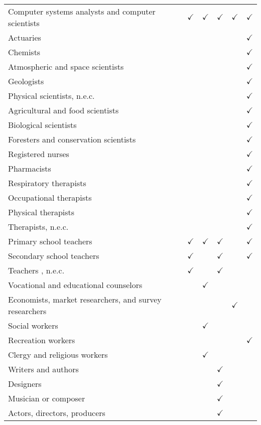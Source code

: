 \begin{tabular}[t]{llllll}
Computer systems analysts and computer scientists & $\checkmark$ & $\checkmark$ & $\checkmark$ & $\checkmark$ & $\checkmark$\\
Actuaries &  &  &  &  & $\checkmark$\\
Chemists &  &  &  &  & $\checkmark$\\
Atmospheric and space scientists &  &  &  &  & $\checkmark$\\
Geologists &  &  &  &  & $\checkmark$\\
Physical scientists, n.e.c. &  &  &  &  & $\checkmark$\\
Agricultural and food scientists &  &  &  &  & $\checkmark$\\
Biological scientists &  &  &  &  & $\checkmark$\\
Foresters and conservation scientists &  &  &  &  & $\checkmark$\\
Registered nurses &  &  &  &  & $\checkmark$\\
Pharmacists &  &  &  &  & $\checkmark$\\
Respiratory therapists &  &  &  &  & $\checkmark$\\
Occupational therapists &  &  &  &  & $\checkmark$\\
Physical therapists &  &  &  &  & $\checkmark$\\
Therapists, n.e.c. &  &  &  &  & $\checkmark$\\
Primary school teachers & $\checkmark$ & $\checkmark$ & $\checkmark$ &  & $\checkmark$\\
Secondary school teachers & $\checkmark$ &  & $\checkmark$ &  & $\checkmark$\\
Teachers , n.e.c. & $\checkmark$ &  & $\checkmark$ &  & \\
Vocational and educational counselors &  & $\checkmark$ &  &  & \\
Economists, market researchers, and survey researchers &  &  &  & $\checkmark$ & \\
Social workers &  & $\checkmark$ &  &  & \\
Recreation workers &  &  &  &  & $\checkmark$\\
Clergy and religious workers &  & $\checkmark$ &  &  & \\
Writers and authors &  &  & $\checkmark$ &  & \\
Designers &  &  & $\checkmark$ &  & \\
Musician or composer &  &  & $\checkmark$ &  & \\
Actors, directors, producers &  &  & $\checkmark$ &  & \\

\end{tabular}
